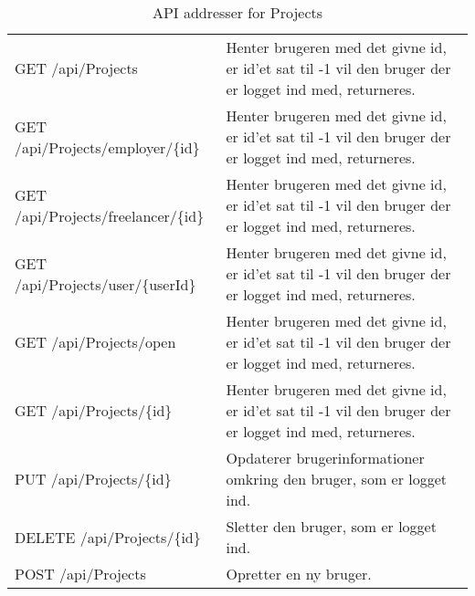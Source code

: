 \begin{table}[H]
	\centering
	\caption{API addresser for Projects}
	\label{tab:web_user}
	\begin{tabular}{|L{0.3\textwidth}|L{0.70\textwidth}|}
		\hline
		\\
		\hline
		GET \newline
		/api/Projects &
		Henter brugeren med det givne id, er id'et sat til -1 vil den bruger der er logget ind med, returneres. \\
        \hline
        GET \newline
		/api/Projects/employer/\{id\} &
		Henter brugeren med det givne id, er id'et sat til -1 vil den bruger der er logget ind med, returneres. \\
        \hline
        GET \newline
		/api/Projects/freelancer/\{id\} &
		Henter brugeren med det givne id, er id'et sat til -1 vil den bruger der er logget ind med, returneres. \\
        \hline
        GET \newline
		/api/Projects/user/\{userId\} &
		Henter brugeren med det givne id, er id'et sat til -1 vil den bruger der er logget ind med, returneres. \\
        \hline
        GET \newline
		/api/Projects/open &
		Henter brugeren med det givne id, er id'et sat til -1 vil den bruger der er logget ind med, returneres. \\
        \hline
        GET \newline
		/api/Projects/\{id\} &
		Henter brugeren med det givne id, er id'et sat til -1 vil den bruger der er logget ind med, returneres. \\
		\hline
		PUT \newline
		/api/Projects/\{id\} &
		Opdaterer brugerinformationer omkring den bruger, som er logget ind. \\
		\hline
		DELETE \newline
		/api/Projects/\{id\} &
		Sletter den bruger, som er logget ind. \\
		\hline
		POST \newline
		/api/Projects &
		Opretter en ny bruger. \\
		\hline
	\end{tabular}
\end{table}

